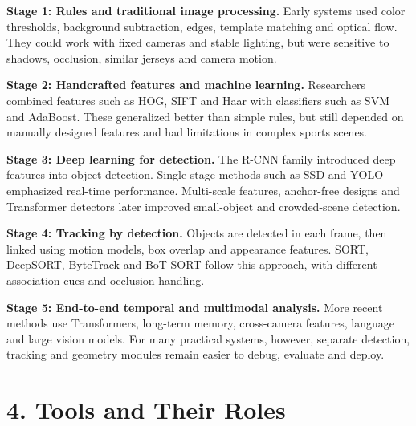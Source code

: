 \documentclass[11pt,a4paper,oneside]{report}
\begin{document}
\begin{historyBox}
\textbf{Stage 1: Rules and traditional image processing.}\quad
Early systems used color thresholds, background subtraction, edges, template matching and optical flow. They could work with fixed cameras and stable lighting, but were sensitive to shadows, occlusion, similar jerseys and camera motion.

\textbf{Stage 2: Handcrafted features and machine learning.}\quad
Researchers combined features such as HOG, SIFT and Haar with classifiers such as SVM and AdaBoost. These generalized better than simple rules, but still depended on manually designed features and had limitations in complex sports scenes.

\textbf{Stage 3: Deep learning for detection.}\quad
The R-CNN family introduced deep features into object detection. Single-stage methods such as SSD and YOLO emphasized real-time performance. Multi-scale features, anchor-free designs and Transformer detectors later improved small-object and crowded-scene detection.

\textbf{Stage 4: Tracking by detection.}\quad
Objects are detected in each frame, then linked using motion models, box overlap and appearance features. SORT, DeepSORT, ByteTrack and BoT-SORT follow this approach, with different association cues and occlusion handling.

\textbf{Stage 5: End-to-end temporal and multimodal analysis.}\quad
More recent methods use Transformers, long-term memory, cross-camera features, language and large vision models. For many practical systems, however, separate detection, tracking and geometry modules remain easier to debug, evaluate and deploy.
\end{historyBox}

\section*{4. Tools and Their Roles}
\end{document}
